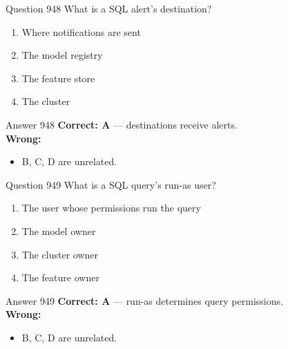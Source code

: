 \documentclass[aspectratio=169,11pt]{beamer}
\begin{document}
	\begin{frame}{Question 948}
		What is a SQL alert's destination?
		\begin{enumerate}[label=\Alph*.]
			\item Where notifications are sent
			\item The model registry
			\item The feature store
			\item The cluster
		\end{enumerate}
	\end{frame}
	\begin{frame}{Answer 948}
		\textbf{Correct: A} --- destinations receive alerts.\\
		\vspace{0.5em}
		\textbf{Wrong:}
		\begin{itemize}
			\item B, C, D are unrelated.
		\end{itemize}
	\end{frame}
	
	\begin{frame}{Question 949}
		What is a SQL query's run-as user?
		\begin{enumerate}[label=\Alph*.]
			\item The user whose permissions run the query
			\item The model owner
			\item The cluster owner
			\item The feature owner
		\end{enumerate}
	\end{frame}
	\begin{frame}{Answer 949}
		\textbf{Correct: A} --- run-as determines query permissions.\\
		\vspace{0.5em}
		\textbf{Wrong:}
		\begin{itemize}
			\item B, C, D are unrelated.
		\end{itemize}
	\end{frame}
	
\end{document}
